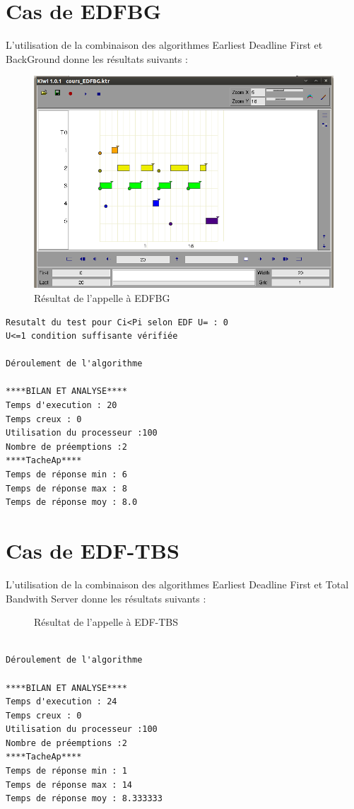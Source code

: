 \section{Cas de EDFBG}
L'utilisation de la combinaison des algorithmes Earliest Deadline First et BackGround donne les résultats suivants : 
\begin{figure}[htbp]
  \centering
  \includegraphics[scale=0.60]{img/EDFBG}
  \caption{Résultat de l'appelle à EDFBG}
  \label{fig:EDFBG}
\end{figure}

\begin{verbatim}
Resutalt du test pour Ci<Pi selon EDF U= : 0
U<=1 condition suffisante vérifiée

Déroulement de l'algorithme

****BILAN ET ANALYSE****
Temps d'execution : 20
Temps creux : 0
Utilisation du processeur :100
Nombre de préemptions :2
****TacheAp****
Temps de réponse min : 6
Temps de réponse max : 8
Temps de réponse moy : 8.0
\end{verbatim}

\section{Cas de EDF-TBS}
L'utilisation de la combinaison des algorithmes Earliest Deadline First et Total Bandwith Server donne les résultats suivants : 
\begin{figure}[htbp]
  \centering
  \caption{Résultat de l'appelle à EDF-TBS}
  \label{fig:EDF-TBS}
\end{figure}

\begin{verbatim}

Déroulement de l'algorithme

****BILAN ET ANALYSE****
Temps d'execution : 24
Temps creux : 0
Utilisation du processeur :100
Nombre de préemptions :2
****TacheAp****
Temps de réponse min : 1
Temps de réponse max : 14
Temps de réponse moy : 8.333333
\end{verbatim}

